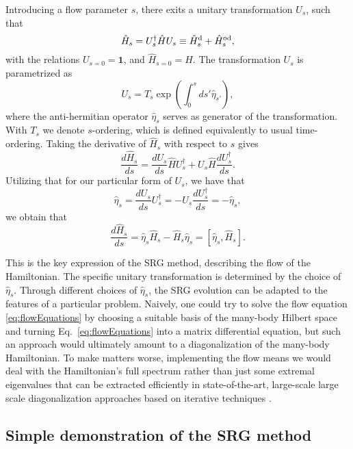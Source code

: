  Introducing a flow parameter $s$, there exits a unitary
 transformation $U_s$, such that
\begin{equation}
 \hat{H}_s = U_s^\dagger \hat{H} U_s \equiv \hat{H}^{\rm d}_s + \hat{H}^{\rm od}_s,
\end{equation}
with the relations $U_{s=0} = \mathbf{1}$, and $\hat{H}_{s= 0} =
\hat{H}$.  The transformation $U_s$ is parametrized as
\[
U_s = T_s \exp \left(\int_0^s \! ds'\hat{\eta}_{s'} \right),
\]
where the anti-hermitian operator $\hat{\eta}_s$ serves as generator
of the transformation. With $T_s$ we denote $s$-ordering, which is
defined equivalently to usual time-ordering.  Taking the derivative of
$\hat{H}_s$ with respect to $s$ gives
\begin{equation}
 \frac{d \hat{H}_s}{ds} = \frac{d U_s}{ds}\hat{H} U_s^\dagger + U_s
 \hat{H} \frac{d U_s^\dagger}{ds}.
\label{eq:flowlong}
\end{equation}
Utilizing that for our particular form of $U_s$, we have that 
\begin{equation}
\hat{\eta}_s = \frac{d U_s}{ds} U_s^\dagger = - U_s \frac{d
  U_s^\dagger}{ds} = -\hat{\eta}_s,
\label{eq:eta}
\end{equation} 
we obtain that 
\begin{equation} 
\frac{d \hat{H}_s}{ds} = \hat{\eta}_s \hat{H}_s
- \hat{H}_s \hat{\eta}_s = \left[\hat{\eta}_s, \hat{H}_s \right].
\label{eq:flowEquations}
\end{equation}

This is the key expression of the SRG method, describing the flow
of the Hamiltonian.  The specific unitary transformation is determined
by the choice of $\hat{\eta}_s$.  Through different choices of
$\hat{\eta}_s$, the SRG evolution can be adapted to the features of a
particular problem.
Naively, one could try to solve the flow equation \eqref{eq:flowEquations} by
choosing a suitable basis of the many-body Hilbert space and turning
Eq.~\eqref{eq:flowEquations} into a matrix differential equation, but such an
approach would ultimately amount to a diagonalization of the many-body
Hamiltonian. To make matters worse, implementing the flow means we
would deal with the Hamiltonian's full spectrum rather than just some
extremal eigenvalues that can be extracted efficiently in
state-of-the-art, large-scale large scale diagonalization approaches based on iterative techniques
\cite{Golub:2013le}.

\subsection{Simple demonstration of the SRG method}


